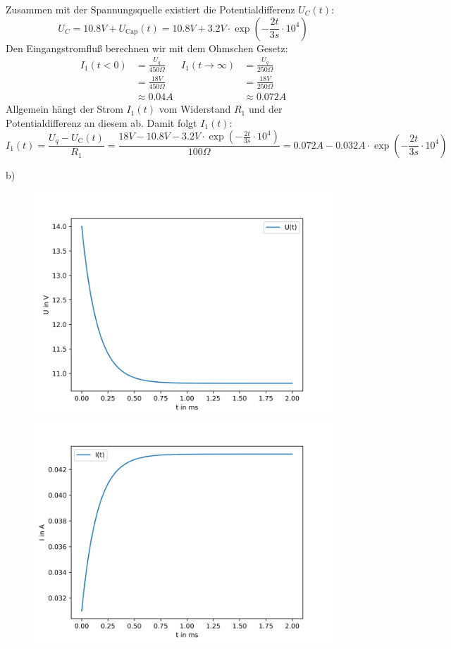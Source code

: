 \documentclass[11pt a4paper]{article}
\begin{document}
Zusammen mit der Spannungsquelle existiert die Potentialdifferenz $U_C(t)$:
\[
	U_C = 10.8V + U_\text{Cap} (t) = 
	10.8V + 3.2 V \cdot  \exp\left( -\frac{2t}{3s} \cdot 10^4\right)
\]
\newpage
Den Eingangstromfluß berechnen wir mit dem Ohmschen Gesetz:
\begin{align*}
	I_1(t < 0) &= \frac{U_q}{450\Omega} &
	I_1(t \rightarrow \infty) &= \frac{U_q}{250\Omega}
	\\
	&= \frac{18V}{450\Omega} & &= \frac{18V}{250\Omega} \\
	&\approx 0.04 A & &\approx 0.072A
\end{align*}
Allgemein hängt der Strom $I_1(t)$ vom Widerstand $R_1$ und der 
Potentialdifferenz an diesem ab. Damit folgt $I_1(t)$:
\[
	I_1(t) = \frac{U_q - U_\text{C}(t)}{R_1}
	= \frac{18V - 10.8V -  3.2V \cdot 
	\exp\left(-\frac{2t}{3s} \cdot 10^4\right)}{100\Omega}
	= 0.072 A  - 0.032A \cdot \exp\left(-\frac{2t}{3s} \cdot 10^4\right)
\]

b)

\begin{figure}[H]
	\centering
	\includegraphics[width=12cm]{aufgabe5b_U.png}
	\includegraphics[width=12cm]{aufgabe5b_I.png}
\end{figure}
\end{document}
